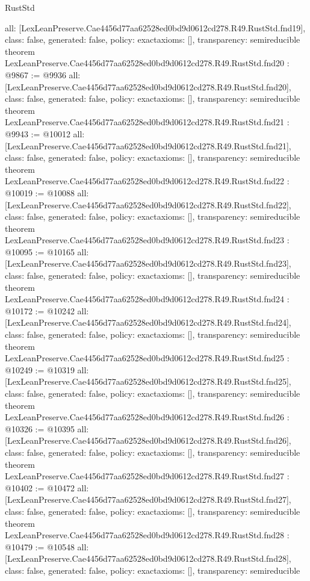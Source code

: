 \begin{lexlean}{RustStd}
\begin{coremodule}
{  all: [LexLeanPreserve.Cae4456d77aa62528ed0bd9d0612cd278.R49.RustStd.fnd19],
  class: false,
  generated: false,
  policy: exact{axioms: []},
  transparency: semireducible
}
theorem LexLeanPreserve.Cae4456d77aa62528ed0bd9d0612cd278.R49.RustStd.fnd20 : @9867 := @9936 {
  all: [LexLeanPreserve.Cae4456d77aa62528ed0bd9d0612cd278.R49.RustStd.fnd20],
  class: false,
  generated: false,
  policy: exact{axioms: []},
  transparency: semireducible
}
theorem LexLeanPreserve.Cae4456d77aa62528ed0bd9d0612cd278.R49.RustStd.fnd21 : @9943 := @10012 {
  all: [LexLeanPreserve.Cae4456d77aa62528ed0bd9d0612cd278.R49.RustStd.fnd21],
  class: false,
  generated: false,
  policy: exact{axioms: []},
  transparency: semireducible
}
theorem LexLeanPreserve.Cae4456d77aa62528ed0bd9d0612cd278.R49.RustStd.fnd22 : @10019 := @10088 {
  all: [LexLeanPreserve.Cae4456d77aa62528ed0bd9d0612cd278.R49.RustStd.fnd22],
  class: false,
  generated: false,
  policy: exact{axioms: []},
  transparency: semireducible
}
theorem LexLeanPreserve.Cae4456d77aa62528ed0bd9d0612cd278.R49.RustStd.fnd23 : @10095 := @10165 {
  all: [LexLeanPreserve.Cae4456d77aa62528ed0bd9d0612cd278.R49.RustStd.fnd23],
  class: false,
  generated: false,
  policy: exact{axioms: []},
  transparency: semireducible
}
theorem LexLeanPreserve.Cae4456d77aa62528ed0bd9d0612cd278.R49.RustStd.fnd24 : @10172 := @10242 {
  all: [LexLeanPreserve.Cae4456d77aa62528ed0bd9d0612cd278.R49.RustStd.fnd24],
  class: false,
  generated: false,
  policy: exact{axioms: []},
  transparency: semireducible
}
theorem LexLeanPreserve.Cae4456d77aa62528ed0bd9d0612cd278.R49.RustStd.fnd25 : @10249 := @10319 {
  all: [LexLeanPreserve.Cae4456d77aa62528ed0bd9d0612cd278.R49.RustStd.fnd25],
  class: false,
  generated: false,
  policy: exact{axioms: []},
  transparency: semireducible
}
theorem LexLeanPreserve.Cae4456d77aa62528ed0bd9d0612cd278.R49.RustStd.fnd26 : @10326 := @10395 {
  all: [LexLeanPreserve.Cae4456d77aa62528ed0bd9d0612cd278.R49.RustStd.fnd26],
  class: false,
  generated: false,
  policy: exact{axioms: []},
  transparency: semireducible
}
theorem LexLeanPreserve.Cae4456d77aa62528ed0bd9d0612cd278.R49.RustStd.fnd27 : @10402 := @10472 {
  all: [LexLeanPreserve.Cae4456d77aa62528ed0bd9d0612cd278.R49.RustStd.fnd27],
  class: false,
  generated: false,
  policy: exact{axioms: []},
  transparency: semireducible
}
theorem LexLeanPreserve.Cae4456d77aa62528ed0bd9d0612cd278.R49.RustStd.fnd28 : @10479 := @10548 {
  all: [LexLeanPreserve.Cae4456d77aa62528ed0bd9d0612cd278.R49.RustStd.fnd28],
  class: false,
  generated: false,
  policy: exact{axioms: []},
  transparency: semireducible
}
\end{coremodule}
\end{lexlean}
